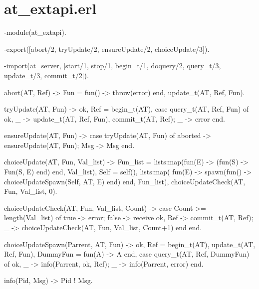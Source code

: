\documentclass[11pt]{article}
\renewenvironment{verbatim}{}{}
\begin{document}
\section{at\_extapi.erl}
\begin{verbatim}
\begin{verbatim}

-module(at_extapi).

-export([abort/2, tryUpdate/2, ensureUpdate/2, choiceUpdate/3]).

-import(at_server, [start/1, stop/1, begin_t/1, doquery/2, query_t/3, update_t/3, commit_t/2]).

%%%-------------------------------------------------------------------
%%% Extended API
%%%-------------------------------------------------------------------

%call update_t/query_t with a errorness function, that is, a function throwing an error.
abort(AT, Ref) -> 
    Fun = fun() -> throw(error) end,
    update_t(AT, Ref, Fun). 

tryUpdate(AT, Fun) -> 
    {ok, Ref} = begin_t(AT),
    case query_t(AT, Ref, Fun) of
        {ok, _} ->
            update_t(AT, Ref, Fun),
            commit_t(AT, Ref); %Returns ok if successfull, else aborted
        _ -> error %Return error if function fails
    end.

ensureUpdate(AT, Fun) ->
    case tryUpdate(AT, Fun) of
        aborted -> ensureUpdate(AT, Fun); %If the update is aborted, try again.
        Msg -> Msg %Can be only ok or error.
    end.

choiceUpdate(AT, Fun, Val_list) -> 
    Fun_list = lists:map(fun(E) -> (fun(S) -> Fun(S, E) end) end, Val_list),
    Self = self(),
    %Start all functions parallel
    lists:map(
        fun(E) -> 
            spawn(fun() -> choiceUpdateSpawn(Self, AT, E) end) 
        end, Fun_list),
    choiceUpdateCheck(AT, Fun, Val_list, 0).

% Waits for all spawned functions of choiceUpdate to 
choiceUpdateCheck(AT, Fun, Val_list, Count) -> 
    case Count >= length(Val_list) of
        true  -> error;
        false -> % else branch
            receive
                {ok, Ref} -> commit_t(AT, Ref);
                _ -> choiceUpdateCheck(AT, Fun, Val_list, Count+1)
            end
    end.

% For subprocesses of choiceUpdate
% Begins a new 
choiceUpdateSpawn(Parrent, AT, Fun) ->
    {ok, Ref} = begin_t(AT),
    update_t(AT, Ref, Fun), %Try to do the update
    DummyFun = fun(A) -> A end, %Dummy function
    case query_t(AT, Ref, DummyFun) of %Check if update is successfull
        {ok, _} -> info(Parrent, {ok, Ref});
        _ -> info(Parrent, error) %Return error if function fails
    end.


%%%-------------------------------------------------------------------
%%% Communication primitives
%%%-------------------------------------------------------------------

info(Pid, Msg) ->
    Pid ! Msg.
\end{verbatim}
\end{verbatim}
\end{document}
